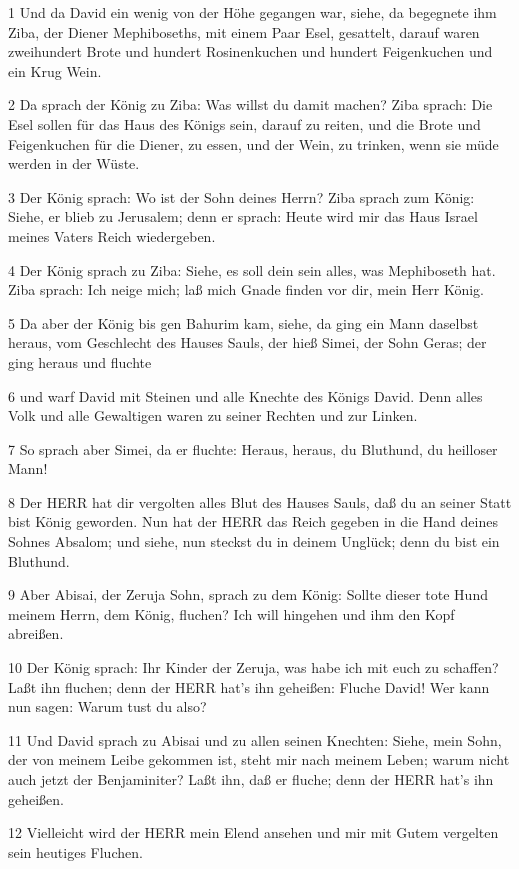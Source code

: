 \par 1 Und da David ein wenig von der Höhe gegangen war, siehe, da begegnete ihm Ziba, der Diener Mephiboseths, mit einem Paar Esel, gesattelt, darauf waren zweihundert Brote und hundert Rosinenkuchen und hundert Feigenkuchen und ein Krug Wein.
\par 2 Da sprach der König zu Ziba: Was willst du damit machen? Ziba sprach: Die Esel sollen für das Haus des Königs sein, darauf zu reiten, und die Brote und Feigenkuchen für die Diener, zu essen, und der Wein, zu trinken, wenn sie müde werden in der Wüste.
\par 3 Der König sprach: Wo ist der Sohn deines Herrn? Ziba sprach zum König: Siehe, er blieb zu Jerusalem; denn er sprach: Heute wird mir das Haus Israel meines Vaters Reich wiedergeben.
\par 4 Der König sprach zu Ziba: Siehe, es soll dein sein alles, was Mephiboseth hat. Ziba sprach: Ich neige mich; laß mich Gnade finden vor dir, mein Herr König.
\par 5 Da aber der König bis gen Bahurim kam, siehe, da ging ein Mann daselbst heraus, vom Geschlecht des Hauses Sauls, der hieß Simei, der Sohn Geras; der ging heraus und fluchte
\par 6 und warf David mit Steinen und alle Knechte des Königs David. Denn alles Volk und alle Gewaltigen waren zu seiner Rechten und zur Linken.
\par 7 So sprach aber Simei, da er fluchte: Heraus, heraus, du Bluthund, du heilloser Mann!
\par 8 Der HERR hat dir vergolten alles Blut des Hauses Sauls, daß du an seiner Statt bist König geworden. Nun hat der HERR das Reich gegeben in die Hand deines Sohnes Absalom; und siehe, nun steckst du in deinem Unglück; denn du bist ein Bluthund.
\par 9 Aber Abisai, der Zeruja Sohn, sprach zu dem König: Sollte dieser tote Hund meinem Herrn, dem König, fluchen? Ich will hingehen und ihm den Kopf abreißen.
\par 10 Der König sprach: Ihr Kinder der Zeruja, was habe ich mit euch zu schaffen? Laßt ihn fluchen; denn der HERR hat's ihn geheißen: Fluche David! Wer kann nun sagen: Warum tust du also?
\par 11 Und David sprach zu Abisai und zu allen seinen Knechten: Siehe, mein Sohn, der von meinem Leibe gekommen ist, steht mir nach meinem Leben; warum nicht auch jetzt der Benjaminiter? Laßt ihn, daß er fluche; denn der HERR hat's ihn geheißen.
\par 12 Vielleicht wird der HERR mein Elend ansehen und mir mit Gutem vergelten sein heutiges Fluchen.
